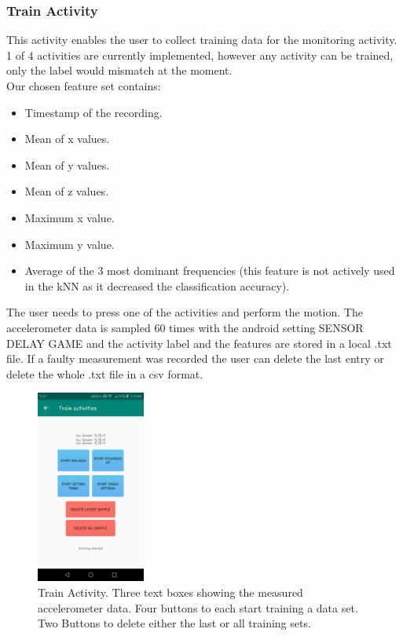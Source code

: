 \documentclass[12pt]{article}
\begin{document}
\pagebreak

\subsubsection{Train Activity} \label{sec:train} 
This activity enables the user to collect training data for the monitoring activity. 1 of 4 activities are currently implemented, however any activity can be trained, only the label would mismatch at the moment.
\\
Our chosen feature set contains:
\begin{itemize}
	\item Timestamp of the recording.
	\item Mean of x values.
	\item Mean of y values.
	\item Mean of z values.
	\item Maximum x value.
	\item Maximum y value.
	\item Average of the 3 most dominant frequencies (this feature is not actively used in the kNN as it decreased the classification accuracy).
\end{itemize}

The user needs to press one of the activities and perform the motion. The accelerometer data is sampled 60 times with the android setting SENSOR DELAY GAME and  the activity label and the features are stored in a local .txt file.
If a faulty measurement was recorded the user can delete the last entry or delete the whole .txt file in a csv format.

\begin{figure}[h]
  \centering
  \includegraphics[width=135px]{images/train_activity}
  \caption{Train Activity. Three text boxes showing the measured accelerometer data. Four buttons to each start training a data set. Two Buttons to delete either the last or all training sets.}
\end{figure}
\end{document}
